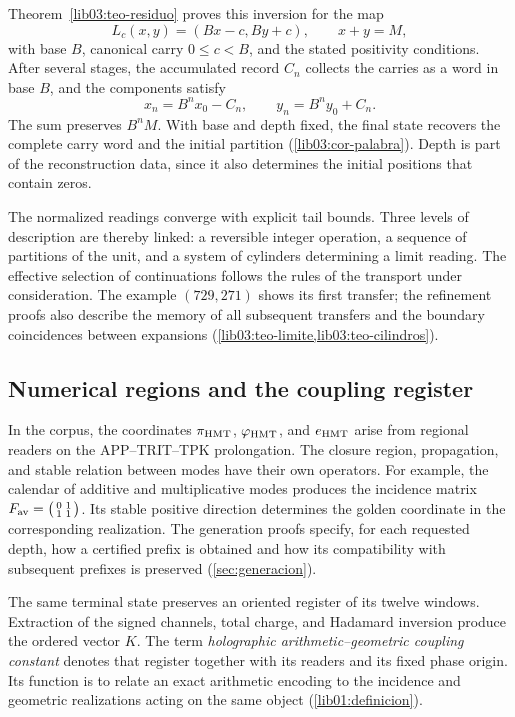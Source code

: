Theorem~\ref{lib03:teo-residuo} proves this inversion for the map
\[
 L_c(x,y)=(Bx-c,By+c),\qquad x+y=M,
\]
with base \(B\), canonical carry \(0\leq c<B\), and the stated
positivity conditions. After several stages, the accumulated record
\(C_n\) collects the carries as a word in base \(B\), and the
components satisfy
\[
 x_n=B^n x_0-C_n,\qquad y_n=B^n y_0+C_n.
\]
The sum preserves \(B^nM\). With base and depth fixed, the final
state recovers the complete carry word and the initial partition
(\cref{lib03:cor-palabra}). Depth is part of the reconstruction
data, since it also determines the initial positions that
contain zeros.

The normalized readings converge with explicit tail bounds.
Three levels of description are thereby linked: a reversible integer
operation, a sequence of partitions of the unit, and a system of
cylinders determining a limit reading. The effective selection of
continuations follows the rules of the transport under consideration. The example
\((729,271)\) shows its first transfer; the refinement
proofs also describe the memory of all subsequent transfers
and the boundary coincidences between expansions
(\cref{lib03:teo-limite,lib03:teo-cilindros}).

\subsection*{Numerical regions and the coupling register}
\label{libnar:registro}

In the corpus, the coordinates \(\pi_{\rm HMT}\),
\(\varphi_{\rm HMT}\), and \(e_{\rm HMT}\) arise from regional
readers on the APP--TRIT--TPK prolongation. The closure region,
propagation, and stable relation between modes have their own
operators. For example, the calendar of additive and multiplicative modes
produces the incidence matrix
\(F_{\rm av}=\bigl(\begin{smallmatrix}0&1\\1&1\end{smallmatrix}\bigr)\).
Its stable positive direction determines the golden coordinate in the
corresponding realization. The generation proofs specify, for
each requested depth, how a certified prefix is obtained and
how its compatibility with subsequent prefixes is preserved
(\cref{sec:generacion}).

The same terminal state preserves an oriented register of its twelve
windows. Extraction of the signed channels, total charge, and
Hadamard inversion produce the ordered vector \(K\). The term
\emph{holographic arithmetic--geometric coupling constant}
denotes that register together with its readers and its fixed phase origin.
Its function is to relate an exact arithmetic encoding
to the incidence and geometric realizations acting on the
same object (\cref{lib01:definicion}).


